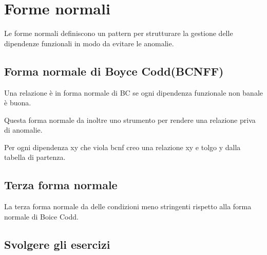 \section{Forme normali}

Le forme normali definiscono un pattern per strutturare la gestione delle dipendenze funzionali in modo da evitare le anomalie.

\subsection{Forma normale di Boyce Codd(BCNFF)}

Una relazione è in forma normale di BC se ogni dipendenza funzionale non banale è buona.

Questa forma normale da inoltre uno strumento per rendere una relazione priva di anomalie.

Per ogni dipendenza xy che viola bcnf creo una relazione xy e tolgo y dalla tabella di partenza.

\subsection{Terza forma normale}

La terza forma normale da delle condizioni meno stringenti rispetto alla forma normale di Boice Codd.

\subsection{Svolgere gli esercizi}

